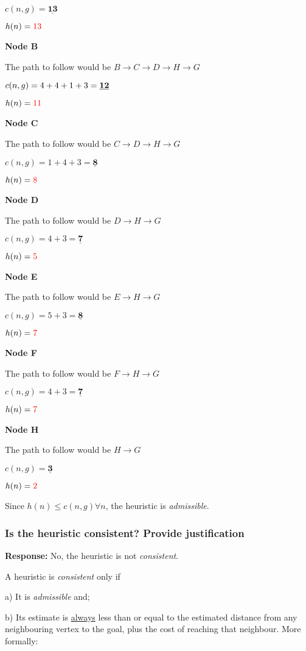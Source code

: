 \documentclass[12pt, letterpaper]{article}
\begin{document}
$c(n,g)=\underline{\textbf{13}}$

$h(n)=\textcolor{red}{13}$

\textbf{Node B}

The path to follow would be $B\rightarrow C\rightarrow D\rightarrow H\rightarrow G$

$c(n,g)=4+4+1+3=\textbf{\underline{12}}$

$h(n)=\textcolor{red}{11}$

\textbf{Node C}

The path to follow would be $C\rightarrow D\rightarrow H\rightarrow G$

$c(n,g)=1+4+3=\underline{\textbf{8}}$

$h(n)=\textcolor{red}{8}$

\textbf{Node D}

The path to follow would be $D\rightarrow H\rightarrow G$

$c(n,g)=4+3=\underline{\textbf{7}}$ 

$h(n)=\textcolor{red}{5}$

\textbf{Node E}

The path to follow would be $E\rightarrow H\rightarrow G$

$c(n,g)=5+3=\underline{\textbf{8}}$ 

$h(n)=\textcolor{red}{7}$

\textbf{Node F}

The path to follow would be $F\rightarrow H\rightarrow G$

$c(n,g)=4+3=\underline{\textbf{7}}$ 

$h(n)=\textcolor{red}{7}$

\textbf{Node H}

The path to follow would be $H\rightarrow G$

$c(n,g)=\underline{\textbf{3}}$ 

$h(n)=\textcolor{red}{2}$

Since $h(n)\leq c(n,g) \forall n$, the heuristic is \textit{admissible}.

\subsubsection{Is the heuristic consistent? Provide justification}
\textbf{Response:} No, the heuristic is not \textit{consistent}.

A heuristic is \textit{consistent} only if 

a) It is \textit{admissible} and;

b) Its estimate is \underline{always} less than or equal to the estimated distance from any neighbouring vertex to the goal, plus the cost of reaching that neighbour. More formally:
\end{document}
